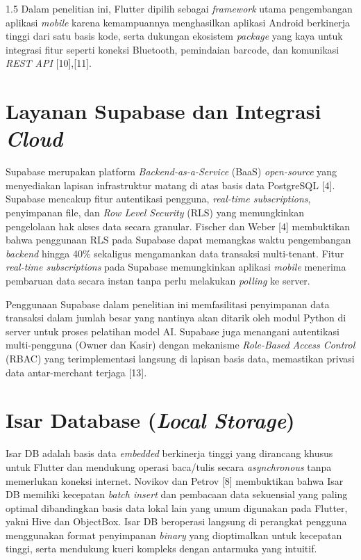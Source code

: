 \documentclass[12pt, a4paper, onecolumn, oneside]{report}
\begin{document}
\begin{spacing}{1.5}
Dalam penelitian ini, Flutter dipilih sebagai \textit{framework} utama pengembangan aplikasi \textit{mobile} karena kemampuannya menghasilkan aplikasi Android berkinerja tinggi dari satu basis kode, serta dukungan ekosistem \textit{package} yang kaya untuk integrasi fitur seperti koneksi Bluetooth, pemindaian barcode, dan komunikasi \textit{REST API} [10],[11].

\section{Layanan Supabase dan Integrasi \textit{Cloud}}

Supabase merupakan platform \textit{Backend-as-a-Service} (BaaS) \textit{open-source} yang menyediakan lapisan infrastruktur matang di atas basis data PostgreSQL [4]. Supabase mencakup fitur autentikasi pengguna, \textit{real-time subscriptions}, penyimpanan file, dan \textit{Row Level Security} (RLS) yang memungkinkan pengelolaan hak akses data secara granular. Fischer dan Weber [4] membuktikan bahwa penggunaan RLS pada Supabase dapat memangkas waktu pengembangan \textit{backend} hingga 40\% sekaligus mengamankan data transaksi multi-tenant. Fitur \textit{real-time subscriptions} pada Supabase memungkinkan aplikasi \textit{mobile} menerima pembaruan data secara instan tanpa perlu melakukan \textit{polling} ke server.

Penggunaan Supabase dalam penelitian ini memfasilitasi penyimpanan data transaksi dalam jumlah besar yang nantinya akan ditarik oleh modul Python di server untuk proses pelatihan model AI. Supabase juga menangani autentikasi multi-pengguna (Owner dan Kasir) dengan mekanisme \textit{Role-Based Access Control} (RBAC) yang terimplementasi langsung di lapisan basis data, memastikan privasi data antar-merchant terjaga [13].

\section{Isar Database (\textit{Local Storage})}

Isar DB adalah basis data \textit{embedded} berkinerja tinggi yang dirancang khusus untuk Flutter dan mendukung operasi baca/tulis secara \textit{asynchronous} tanpa memerlukan koneksi internet. Novikov dan Petrov [8] membuktikan bahwa Isar DB memiliki kecepatan \textit{batch insert} dan pembacaan data sekuensial yang paling optimal dibandingkan basis data lokal lain yang umum digunakan pada Flutter, yakni Hive dan ObjectBox. Isar DB beroperasi langsung di perangkat pengguna menggunakan format penyimpanan \textit{binary} yang dioptimalkan untuk kecepatan tinggi, serta mendukung kueri kompleks dengan antarmuka yang intuitif.


\end{spacing}
\end{document}
